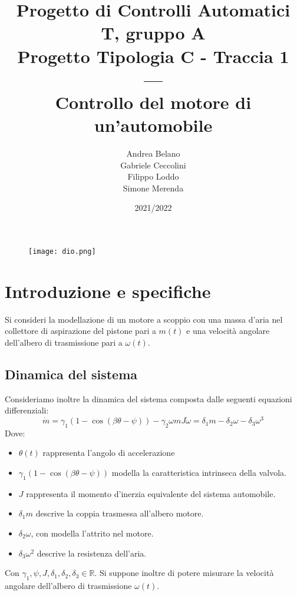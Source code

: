 \documentclass{article}
\date{2021/2022}
\title{Progetto di Controlli Automatici T, gruppo A \\
Progetto Tipologia C - Traccia 1 \\
---\\
Controllo del motore di un'automobile 
}
\author{Andrea Belano\\ Gabriele Ceccolini\\ Filippo Loddo\\ Simone Merenda}
\begin{document}
\maketitle
\begin{figure}[htp]
    \centering
    \texttt{[image: dio.png]}
\end{figure}

\newpage
\renewcommand*\contentsname{Indice}
\tableofcontents
\newpage
\section{Introduzione e specifiche}

Si consideri la modellazione di un motore a scoppio con una massa d'aria nel collettore di aspirazione del pistone pari a $m(t)$ e una velocità angolare dell'albero di trasmissione pari a $\omega(t)$. 
\subsection{Dinamica del sistema}
Consideriamo inoltre la dinamica del sistema composta dalle seguenti equazioni differenziali: 
\begin{subequations}
\begin{equation}\label{1a}
    \dot{m} = \gamma_1(1-\cos(\beta\theta - \psi))-\gamma_2\omega m 
\end{equation}
\begin{equation}
    J\dot{\omega} = \delta_1 m - \delta_2 \omega - \delta_3 \omega^3
\end{equation}
\end{subequations}
Dove: \newline
\begin{itemize}
    \item $\theta(t)$ rappresenta l'angolo di accelerazione
    \item $\gamma_1(1-\cos(\beta\theta - \psi))$ modella la caratteristica intrinseca della valvola.
    \item $J$ rappresenta il momento d'inerzia equivalente del sistema automobile.
    \item $\delta_1 m$ descrive la coppia trasmessa all'albero motore.
    \item $\delta_2 \omega$, con  modella l'attrito nel motore.
    \item $\delta_3 \omega^2$ descrive la
resistenza dell'aria.
\end{itemize} 
Con $\gamma_1,\psi,J, \delta_1,\delta_2,\delta_3 \in  \mathbb{R}$. \newline
\linebreak
Si suppone inoltre di potere misurare la velocità angolare dell'albero di trasmissione $\omega(t)$.
\end{document}
